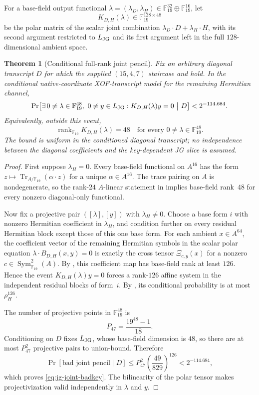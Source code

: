 \documentclass[11pt]{article}
\newtheorem{theorem}{Theorem}[section]
\newcommand{\F}{\mathbb F}
\newcommand{\rank}{\operatorname{rank}}
\begin{document}
For a base-field output functional
$\lambda=(\lambda_D,\lambda_H)\in\F_{19}^{32}\oplus\F_{19}^{16}$, let
\[
 K_{D,H}(\lambda)\in\F_{19}^{128\times48}
\]
be the polar matrix of the scalar joint combination
$\lambda_D\cdot D+\lambda_H\cdot H$, with its second argument restricted to
$L_{\rm JG}$ and its first argument left in the full $128$-dimensional
ambient space.

\begin{theorem}[Conditional full-rank joint pencil]
\label{thm:jg-joint-fullrank}
Fix an arbitrary diagonal transcript $D$ for which the supplied
$(15,4,7)$ staircase and  hold.  In the conditional
native-coordinate XOF-transcript model for the remaining Hermitian channel,
\begin{equation}
 \Pr\!\left[\exists\,0\ne\lambda\in\F_{19}^{48},\ 0\ne y\in L_{\rm JG}:
     K_{D,H}(\lambda)y=0\ \middle|\ D\right]
 <2^{-114.684}.
 \label{eq:jg-joint-badkey}
\end{equation}
Equivalently, outside this event,
\begin{equation}
  \boxed{\rank_{\F_{19}}K_{D,H}(\lambda)=48
         \quad\text{for every }0\ne\lambda\in\F_{19}^{48}.}
  \label{eq:jg-joint-rank48}
\end{equation}
The bound is uniform in the conditioned diagonal transcript; no independence
between the diagonal coefficients and the key-dependent JG slice is assumed.
\end{theorem}

\begin{proof}
First suppose $\lambda_H=0$.  Every base-field functional on $A^{16}$ has the
form $z\mapsto\operatorname{Tr}_{A/\F_{19}}(\alpha\cdot z)$ for a unique
$\alpha\in A^{16}$.  The trace pairing on $A$ is nondegenerate, so the
rank-$24$ $A$-linear statement in  implies base-field
rank~$48$ for every nonzero diagonal-only functional.

Now fix a projective pair $([\lambda],[y])$ with $\lambda_H\ne0$.  Choose a
base form $i$ with nonzero Hermitian coefficient in $\lambda_H$, and condition
further on every residual Hermitian block except those of this one base form.
For each ambient $x\in A^{64}$, the coefficient vector of the remaining
Hermitian symbols in the scalar polar equation
$\lambda\cdot B_{D,H}(x,y)=0$ is exactly the cross tensor
$\Xi_{c,y}(x)$ for a nonzero
$c\in\operatorname{Sym}^2_{\F_{19}}(A)$.  By
, this coefficient map has base-field rank at least
$126$.  Hence the event $K_{D,H}(\lambda)y=0$ forces a rank-$126$ affine
system in the independent residual blocks of form~$i$.  By
, its conditional probability is at most
$\rho_H^{126}$.

The number of projective points in $\F_{19}^{48}$ is
\[
  P_{47}=\frac{19^{48}-1}{18}.
\]
Conditioning on $D$ fixes $L_{\rm JG}$, whose base-field dimension is $48$,
so there are at most $P_{47}^2$ projective pairs to union-bound.  Therefore
\[
 \Pr[\text{bad joint pencil}\mid D]
 \le P_{47}^2\left(\frac{49}{829}\right)^{126}
 <2^{-114.684},
\]
which proves \eqref{eq:jg-joint-badkey}.  The bilinearity of the polar tensor
makes projectivization valid independently in $\lambda$ and $y$.
\end{proof}
\end{document}
